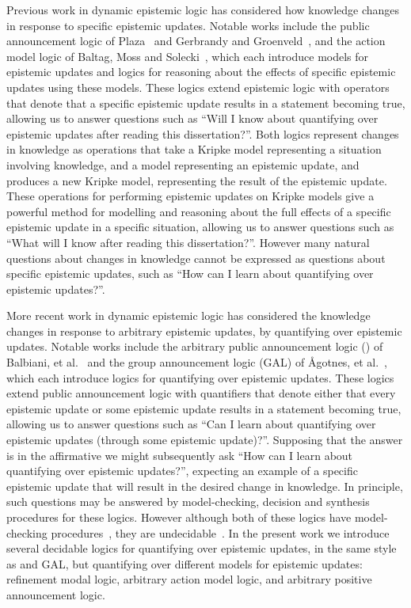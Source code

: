 Previous work in dynamic epistemic logic has considered how knowledge changes in response to specific epistemic updates.
Notable works include the public announcement logic of Plaza~\cite{plaza:1989} and Gerbrandy and Groenveld~\cite{gerbrandy:1997}, and the action model logic of Baltag, Moss and Solecki~\cite{baltag:1998,baltag:2004}, which each introduce models for epistemic updates and logics for reasoning about the effects of specific epistemic updates using these models.
These logics extend epistemic logic with operators that denote that a specific epistemic update results in a statement becoming true, allowing us to answer questions such as ``Will I know about quantifying over epistemic updates after reading this dissertation?''.
Both logics represent changes in knowledge as operations that take a Kripke model representing a situation involving knowledge, and a model representing an epistemic update, and produces a new Kripke model, representing the result of the epistemic update.
These operations for performing epistemic updates on Kripke models give a powerful method for modelling and reasoning about the full effects of a specific epistemic update in a specific situation, allowing us to answer questions such as ``What will I know after reading this dissertation?''.
However many natural questions about changes in knowledge cannot be expressed as questions about specific epistemic updates, such as ``How can I learn about quantifying over epistemic updates?''.

More recent work in dynamic epistemic logic has considered the knowledge changes in response to arbitrary epistemic updates, by quantifying over epistemic updates.
Notable works include the arbitrary public announcement logic (\logicApal{}) of Balbiani, et al.~\cite{balbiani:2007} and the group announcement logic (GAL) of {\AA}gotnes, et al.~\cite{agotnes:2008,agotnes:2010}, which each introduce logics for quantifying over epistemic updates.
These logics extend public announcement logic with quantifiers that denote either that every epistemic update or some epistemic update results in a statement becoming true, allowing us to answer questions such as ``Can I learn about quantifying over epistemic updates (through some epistemic update)?''.
Supposing that the answer is in the affirmative we might subsequently ask ``How can I learn about quantifying over epistemic updates?'', expecting an example of a specific epistemic update that will result in the desired change in knowledge.
In principle, such questions may be answered by model-checking, decision and synthesis procedures for these logics.
However although both of these logics have model-checking procedures~\cite{agotnes:2010}, they are undecidable~\cite{agotnes:2014}.
In the present work we introduce several decidable logics for quantifying over epistemic updates, in the same style as \logicApal{} and GAL, but quantifying over different models for epistemic updates: refinement modal logic, arbitrary action model logic, and arbitrary positive announcement logic.

